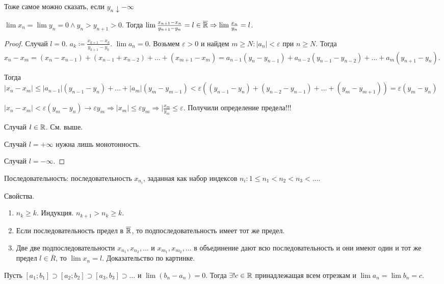 \begin{remark}
    Тоже самое можно сказать, если $y_n \downarrow -\infty$
\end{remark}
\begin{theorem}
    $\lim x_n = \lim y_n = 0 \land y_n > y_{n+1} > 0$. Тогда  $\lim \frac{x_{n+1} - x_n}{y_{n+1} - y_n} = l \in \overline{\mathbb{R}} \Rightarrow \lim \frac{x_n}{y_n} = l$.
\end{theorem}
\begin{proof}
    Случай $l = 0$.  $a_k \coloneqq \frac{x_{k+1} - x_k}{y_{k+1} - y_k}$.  $\lim a_n = 0$. Возьмем  $\varepsilon > 0$ и найдем  $m \ge N: |a_n| < \varepsilon$ при  $n \ge N$. Тогда $x_n - x_m = (x_n - x_{n-1}) + (x_{n-1} + x_{n-2}) + \ldots + (x_{m+1} - x_m) = a_{n-1}(y_n - y_{n-1}) + a_{n-2}(y_{n-1} - y_{n-2}) + \ldots + a_{m} (y_{n+1} - y_n).$

    Тогда $|x_n - x_m| \le |a_{n-1}|(y_{n-1} - y_n) + \ldots + |a_m|(y_m - y_{m-1}) < \varepsilon ((y_{n-1} - y_n) + (y_{n-2} - y_{n-1}) + \ldots + (y_m - y_{m+1})) = \varepsilon(y_m - y_n)$ 

    $|x_n - x_m| < \varepsilon(y_m - y_n) \to \varepsilon y_m \Rightarrow |x_m| \le \varepsilon y_m \Rightarrow |\frac{x_m}{y_m} \le \varepsilon$. Получили определение предела!!!

    Случай $l \in \mathbb{R}$. См. выше.

    Случай $l = +\infty$ нужна лишь монотонность.

    Случай  $l = -\infty$.
\end{proof}
\begin{definition}
    Последовательность: последовательность $x_{n_i}$, заданная как набор индексов $n_i: 1 \le n_1 < n_2 < n_3 < \ldots$. 
\end{definition}
\slashn
Свойства.
\begin{enumerate}
    \item $n_k \ge k$. Индукция. $n_{k+1} > n_k \ge k$.
    \item Если последовательность предел в $\overline{\mathbb{R}}$, то подпоследовательность имеет тот же предел.
    \item Две две подпоследовательности  $x_{n_1}, x_{n_2},\ldots$ и $x_{m_1}, x_{m_2},\ldots$ в объединение дают всю последовательность и они имеют один и тот же предел $l \in \overline{R}$, то  $\lim x_n = l$. Доказательство по картинке.
\end{enumerate}
\begin{theorem}
    Пусть $[a_1; b_1] \supset [a_2; b_2] \supset [a_3, b_3] \supset \ldots$ и $\lim (b_n - a_n) = 0$. Тогда  $\exists! c \in \mathbb{R}$ принадлежащая всем отрезкам и  $\lim a_n = \lim b_n = c$.
\end{theorem}
